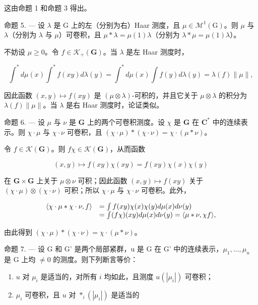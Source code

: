 这由命题 1 和命题 3 得出。

命题 5. --- 设 \(\lambda\) 是 G 上的左（分别为右）Haar 测度，且 \(\mu \in \mathcal{M}^1(\mathrm{G})\)。则 \(\mu\) 与 \(\lambda\)（分别为 \(\lambda\) 与 \(\mu\)）可卷积，且 \(\mu * \lambda = \mu(1)\lambda\)（分别为 \(\lambda * \mu = \mu(1)\lambda\)）。

不妨设 \(\mu \geqslant 0\)。令 \(f \in \mathcal{K}_{+}(\mathbf{G})\)。当 \(\lambda\) 是左 Haar 测度时，

\[
\int^ {*} d \mu (x) \int^ {*} f (x y) d \lambda (y) = \int^ {*} d \mu (x) \int f (y) d \lambda (y) = \lambda (f) \| \mu \|,
\]

因此函数 \((x,y)\mapsto f(xy)\) 是 \((\mu \otimes \lambda)\)-可积的，并且它关于 \(\mu \otimes \lambda\) 的积分为 \(\lambda (f)\| \mu \|\)。当 \(\lambda\) 是右 Haar 测度时，论证类似。

命题 6. --- 设 \(\mu\) 与 \(\nu\) 是 \(\mathbf{G}\) 上的两个可卷积测度。设 \(\chi\) 是 \(\mathbf{G}\) 在 \(\mathbf{C}^*\) 中的连续表示。则 \(\chi \cdot \mu\) 与 \(\chi \cdot \nu\) 可卷积，且 \((\chi \cdot \mu) * (\chi \cdot \nu) = \chi \cdot (\mu * \nu)\)。

令 \(f \in \mathcal{K}(\mathbf{G})\)。则 \(f\chi \in \mathcal{K}(\mathbf{G})\)，从而函数

\[
(x, y) \mapsto f (x y) \chi (x y) = f (x y) \chi (x) \chi (y)
\]

在 \(\mathbf{G} \times \mathbf{G}\) 上关于 \(\mu \otimes \nu\) 可积；因此函数 \((x, y) \mapsto f(xy)\) 关于 \((\chi \cdot \mu) \otimes (\chi \cdot \nu)\) 可积；所以 \(\chi \cdot \mu\) 与 \(\chi \cdot \nu\) 可卷积。此外，

\[
\begin{array}{r l} \langle \chi \cdot \mu * \chi \cdot \nu , f \rangle & = \int f (x y) \chi (x) \chi (y) d \mu (x) d \nu (y) \\ & = \int (f \chi) (x y) d \mu (x) d \nu (y) = \langle \mu * \nu , \chi f \rangle , \end{array}
\]

由此得到 \((\chi \cdot \mu) * (\chi \cdot \nu) = \chi \cdot (\mu * \nu)\)。

命题 7. --- 设 G 和 G' 是两个局部紧群，u 是 G 在 G' 中的连续表示，\(\mu_{1},\ldots,\mu_{n}\) 是 G 上均 \(\neq0\) 的测度。则下列断言等价：

\begin{enumerate}
\def\labelenumi{(\roman{enumi})}
\item
  \(u\) 对 \(\mu_{i}\) 是适当的，对所有 \(i\) 均如此，且测度 \(u(|\mu_i|)\) 可卷积；
\item
  \(\mu_{i}\) 可卷积，且 \(u\) 对 \(*_{i}(|\mu_{i}|)\) 是适当的
\end{enumerate}

